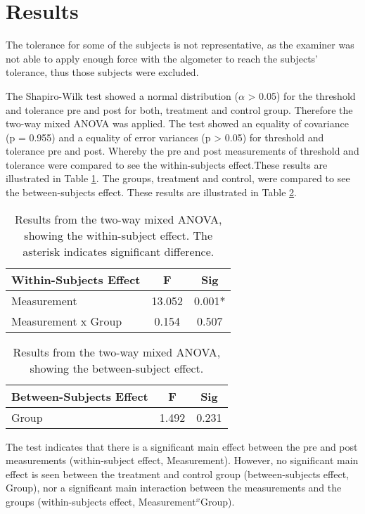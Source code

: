 \section{Results}
The tolerance for some of the subjects is not representative, as the examiner was not able to apply enough force with the algometer to reach the subjects' tolerance, thus those subjects were excluded. 

The Shapiro-Wilk test showed a normal distribution ($\alpha$ > 0.05) for the threshold and tolerance pre and post for both, treatment and control group. Therefore the two-way mixed ANOVA was applied. The test showed an equality of covariance (p = 0.955) and a equality
of error variances (p > 0.05) for threshold and tolerance pre and post. 
Whereby the pre and post measurements of threshold and tolerance were compared to see the  within-subjects effect.These results are illustrated in Table \ref{table:TWOWAYANOVA1}. The groups, treatment and control, were compared to see the between-subjects effect. These results are illustrated in  Table \ref{table:TWOWAYANOVA2}. 

\begin{table}[ht]
\caption{Results from the two-way mixed ANOVA, showing the within-subject effect. The asterisk indicates significant difference.}
\centering
\begin{tabular}{l c c}
\hline\hline
\textbf{Within-Subjects Effect} & \textbf{F} & \textbf{Sig} \\ [0.5ex] %
\hline
Measurement &  13.052 &  0.001* \\
Measurement x Group & 0.154 & 0.507 \\
\hline
\end{tabular}
\label{table:TWOWAYANOVA1}
\end{table}

\begin{table}[ht]
\caption{Results from the two-way mixed ANOVA, showing the between-subject effect.}
\centering
\begin{tabular}{l c c}
\hline
\textbf{Between-Subjects Effect} & \textbf{F} & \textbf{Sig} \\ [0.5ex] %
\hline
Group &  1.492 &  0.231 \\
\hline
\end{tabular}
\label{table:TWOWAYANOVA2}
\end{table}

\noindent
The test indicates that there is a significant main effect between the pre and post measurements (within-subject effect, Measurement). However, no significant main effect is seen between the treatment and control group (between-subjects effect, Group), nor a significant main interaction between the measurements and the groups (within-subjects effect, Measurement$^{x}$Group).

